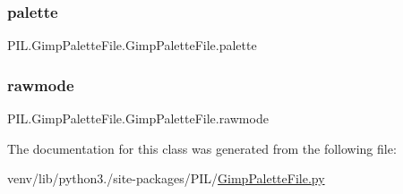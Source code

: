 \subsubsection{\texorpdfstring{palette}{palette}}
{\footnotesize\ttfamily P\+I\+L.\+Gimp\+Palette\+File.\+Gimp\+Palette\+File.\+palette}

\mbox{\label{classPIL_1_1GimpPaletteFile_1_1GimpPaletteFile_ad83daa637ba5a3bde200cff34a6d6a4e}} 
\subsubsection{\texorpdfstring{rawmode}{rawmode}}
{\footnotesize\ttfamily P\+I\+L.\+Gimp\+Palette\+File.\+Gimp\+Palette\+File.\+rawmode\hspace{0.3cm}{\ttfamily [static]}}



The documentation for this class was generated from the following file\+:\begin{DoxyCompactItemize}
\item 
venv/lib/python3./site-\/packages/\+P\+I\+L/\hyperlink{GimpPaletteFile_8py}{Gimp\+Palette\+File.\+py}\end{DoxyCompactItemize}
